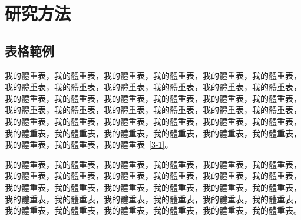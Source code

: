 \chapter{研究方法}

\section{表格範例}
我的體重表，我的體重表，我的體重表，我的體重表，我的體重表，我的體重表，我的體重表，我的體重表，我的體重表，我的體重表，我的體重表，我的體重表，我的體重表，我的體重表，我的體重表，我的體重表，我的體重表，我的體重表，我的體重表，我的體重表，我的體重表，我的體重表，我的體重表，我的體重表，我的體重表，我的體重表，我的體重表，我的體重表，我的體重表，我的體重表，我的體重表，我的體重表，我的體重表，我的體重表，我的體重表，我的體重表，我的體重表，我的體重表，我的體重表~\ref{3-1}。



我的體重表，我的體重表，我的體重表，我的體重表，我的體重表，我的體重表，我的體重表，我的體重表，我的體重表，我的體重表，我的體重表，我的體重表，我的體重表，我的體重表，我的體重表，我的體重表，我的體重表，我的體重表，我的體重表，我的體重表，我的體重表，我的體重表，我的體重表，我的體重表，我的體重表，我的體重表，我的體重表，我的體重表，我的體重表，我的體重表。


